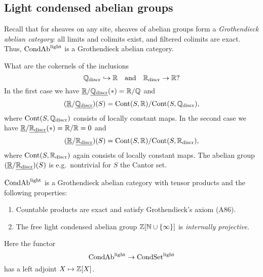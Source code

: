 \documentclass{notes}
\begin{document}
\subsection{Light condensed abelian groups}

Recall that for sheaves on any site, sheaves of abelian groups form a
{\em Grothendieck abelian category}: all limits and colimits exist,
and filtered colimits are exact. 
Thus, $\text{CondAb}^{\rm light}$ is a Grothendieck abelian category. 

\begin{example}
What are the cokernels of the inclusions
$$
  {\mathbb{Q}}_{\rm discr}\hookrightarrow{\mathbb{R}} \quad\text{and}\quad {\mathbb{R}}_{\rm discr}\to {\mathbb{R}}?
$$
In the first case we have $\underline{{\mathbb{R}}}/\underline{{\mathbb{Q}}_{\rm discr}}(*)={\mathbb{R}}/{\mathbb{Q}}$ and 
$$
  (\underline{{\mathbb{R}}}/\underline{{\mathbb{Q}}_{\rm discr}})(S) = {\rm Cont}(S,{\mathbb{R}})/{\rm Cont}(S,{\mathbb{Q}}_{\rm discr}),
$$
where ${\rm Cont}(S,{\mathbb{Q}}_{\rm discr})$ consists of locally constant maps.
In the second case we have $\underline{{\mathbb{R}}}/\underline{{\mathbb{R}}_{\rm discr}}(*)={\mathbb{R}}/{\mathbb{R}}=0$ and 
$$
  (\underline{{\mathbb{R}}}/\underline{{\mathbb{R}}_{\rm discr}})(S) = {\rm Cont}(S,{\mathbb{R}})/{\rm Cont}(S,{\mathbb{R}}_{\rm discr}),
$$
where ${\rm Cont}(S,{\mathbb{R}}_{\rm discr})$ again consists of locally constant maps.
The abelian group $(\underline{{\mathbb{R}}}/\underline{{\mathbb{R}}_{\rm discr}})(S)$ is e.g.~nontrivial for
$S$ the Cantor set.
\end{example}

\begin{thm}
$\text{CondAb}^{\rm light}$ is a Grothendieck abelian category with
  tensor products and the following properties:
\begin{enumerate}
\item Countable products are exact and satisfy Grothendieck's axiom
  (A86).
\item The free light condensed abelian group ${\mathbb{Z}}[{\mathbb{N}}\cup\{\infty\}]$ is
  {\em internally projective}. 
\end{enumerate}
\end{thm}

Here the functor 
$$
  \text{CondAb}^{\rm light} \to \text{CondSet}^{\rm light}
$$
has a left adjoint $X\mapsto {\mathbb{Z}}[X]$. 
  
\printbibliography
\end{document}
